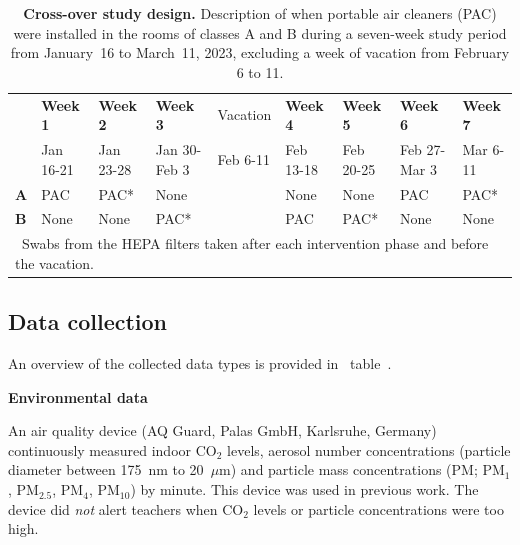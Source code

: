 \documentclass[fleqn,11pt]{wlscirep}
\begin{document}
\begin{table}[!htpb]
    \footnotesize
    \centering
    \caption{\textbf{Cross-over study design.} Description of when portable air cleaners (PAC) were installed in the rooms of classes A and B during a seven-week study period from January~16 to March~11, 2023, excluding a week of vacation from February 6 to 11.}\label{tab:study_design}
    \begin{tabular}{l l l l l l l l l}
    \toprule
      & \textbf{Week 1} & \textbf{Week 2} & \textbf{Week 3} & Vacation & \textbf{Week 4} & \textbf{Week 5} & \textbf{Week 6} & \textbf{Week 7} \\
      & Jan 16-21 & Jan 23-28 & Jan 30-Feb 3 & Feb 6-11 & Feb 13-18 & Feb 20-25 & Feb 27-Mar 3 & Mar 6-11 \\
      \midrule
      \textbf{A} & \cellcolor{gray!50} PAC & \cellcolor{gray!50} PAC\hphantom{000}*& \cellcolor{gray!10} None & & \cellcolor{gray!10} None & \cellcolor{gray!10} None & \cellcolor{gray!50} PAC & \cellcolor{gray!50} PAC\hphantom{0000}* \\
      \textbf{B} & \cellcolor{gray!10} None & \cellcolor{gray!10} None & \cellcolor{gray!50} PAC\hphantom{00000}* & & \cellcolor{gray!50} PAC & \cellcolor{gray!50} PAC\hphantom{000}*& \cellcolor{gray!10} None & \cellcolor{gray!10} None \\
      \bottomrule
      \multicolumn{9}{l}{\scriptsize *~Swabs from the HEPA filters taken after each intervention phase and before the vacation.}
    \end{tabular}
\end{table}
 
\subsection*{Data collection}

An overview of the collected data types is provided in \supp~table~. \medskip

\noindent\textbf{Environmental data} \smallskip

\noindent An air quality device (AQ Guard, Palas GmbH, Karlsruhe, Germany) continuously measured indoor CO$_2$ levels, aerosol number concentrations (particle diameter between 175~nm to 20~$\mu$m) and particle mass concentrations (PM; PM$_1$, PM$_{2.5}$, PM$_4$, PM$_{10}$) by minute. This device was used in previous work\cite{DiGilio2021,Duill2021,Banholzer2023PLoSMed}. The device did \emph{not} alert teachers when CO$_2$ levels or particle concentrations were too high.\medskip
\end{document}
